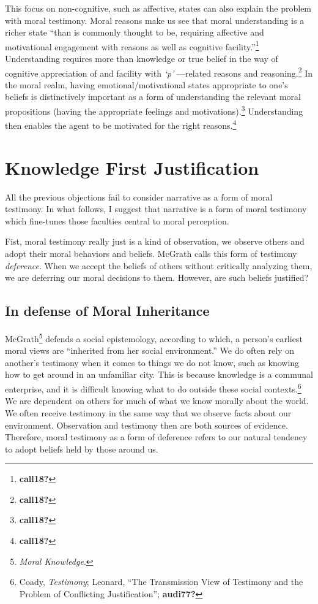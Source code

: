 \documentclass[
  12pt,
]{book}
\theoremstyle{definition}
\theoremstyle{definition}
\theoremstyle{definition}
\theoremstyle{definition}
\theoremstyle{remark}
\begin{document}
This focus on non-cognitive, such as affective, states can also explain the problem with moral testimony. Moral reasons make us see that moral understanding is a richer state ``than is commonly thought to be, requiring affective and motivational engagement with reasons as well as cognitive facility.''\footnote{\textbf{call18?}} Understanding requires more than knowledge or true belief in the way of cognitive appreciation of and facility with \emph{`p'} ---related reasons and reasoning.\footnote{\textbf{call18?}} In the moral realm, having emotional/motivational states appropriate to one's beliefs is distinctively important as a form of understanding the relevant moral propositions (having the appropriate feelings and motivations).\footnote{\textbf{call18?}} Understanding then enables the agent to be motivated for the right reasons.\footnote{\textbf{call18?}}

\section{Knowledge First Justification}\label{knowledge-first-justification-1}

All the previous objections fail to consider narrative as a form of moral testimony. In what follows, I suggest that narrative is a form of moral testimony which fine-tunes those faculties central to moral perception.

Fist, moral testimony really just is a kind of observation, we observe others and adopt their moral behaviors and beliefs. McGrath calls this form of testimony \emph{deference}. When we accept the beliefs of others without critically analyzing them, we are deferring our moral decisions to them. However, are such beliefs justified?

\subsection*{In defense of Moral Inheritance}\label{in-defense-of-moral-inheritance-1}

McGrath\footnote{\emph{Moral {Knowledge}}.} defends a social epistemology, according to which, a person's earliest moral views are ``inherited from her social environment.'' We do often rely on another's testimony when it comes to things we do not know, such as knowing how to get around in an unfamiliar city. This is because knowledge is a communal enterprise, and it is difficult knowing what to do outside these social contexts.\footnote{Coady, \emph{Testimony}; Leonard, {``The {Transmission View} of {Testimony} and the {Problem} of {Conflicting Justification}''}; \textbf{audi77?}} We are dependent on others for much of what we know morally about the world. We often receive testimony in the same way that we observe facts about our environment. Observation and testimony then are both sources of evidence. Therefore, moral testimony as a form of deference refers to our natural tendency to adopt beliefs held by those around us.
\end{document}
